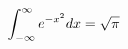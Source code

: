 \documentclass[preview]{standalone}
\begin{document}
\begin{align*}
\special{dvisvgm:raw <g id='unique000'>}\int_{-\infty}^{\infty} e^{-x^2} dx = \sqrt{\pi}\special{dvisvgm:raw </g>}
\end{align*}
\end{document}
